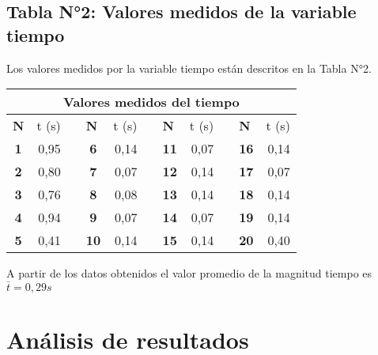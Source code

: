 \documentclass[runningheads]{llncs}
\begin{document}
    \subsection*{Tabla N°2: Valores medidos de la variable tiempo}
    Los valores medidos por la variable tiempo están descritos en la Tabla N°2.\\
    \begin{table}[]
        \centering
        \begin{tabular}{crlcrlcrlcr}
            \hline
            \multicolumn{11}{c}{\textbf{Valores medidos del tiempo}} \\ \hline
            \multicolumn{1}{l}{\textbf{N}} & \multicolumn{1}{l}{t (s)} &  & \multicolumn{1}{l}{\textbf{N}} & \multicolumn{1}{l}{t (s)} &  & \multicolumn{1}{l}{\textbf{N}} & \multicolumn{1}{l}{t (s)} &  & \multicolumn{1}{l}{\textbf{N}} & \multicolumn{1}{l}{t (s)} \\ \hline
            \textbf{1} & 0,95 &  & \textbf{6} & 0,14 &  & \textbf{11} & 0,07 &  & \textbf{16} & 0,14 \\
            \textbf{2} & 0,80 &  & \textbf{7} & 0,07 &  & \textbf{12} & 0,14 &  & \textbf{17} & 0,07 \\
            \textbf{3} & 0,76 &  & \textbf{8} & 0,08 &  & \textbf{13} & 0,14 &  & \textbf{18} & 0,14 \\
            \textbf{4} & 0,94 &  & \textbf{9} & 0,07 &  & \textbf{14} & 0,07 &  & \textbf{19} & 0,14 \\
            \textbf{5} & 0,41 &  & \textbf{10} & 0,14 &  & \textbf{15} & 0,14 &  & \textbf{20} & 0,40 \\ \hline
        \end{tabular}
    \end{table}
    A partir de los datos obtenidos el valor promedio de la magnitud tiempo es $\bar{t}=0,29s$

    \section*{\centering Análisis de resultados}
\end{document}
